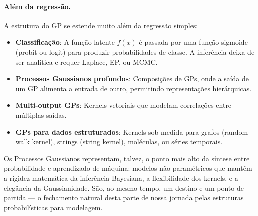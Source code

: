 \documentclass{tufte-handout}
\begin{document}
\paragraph{Além da regressão.}

A estrutura do GP se estende muito além da regressão simples:
\begin{itemize}
    \item \textbf{Classificação}: A função latente $f(x)$ é passada por uma função sigmoide (probit ou logit) para produzir probabilidades de classe. A inferência deixa de ser analítica e requer Laplace, EP, ou MCMC.
    \item \textbf{Processos Gaussianos profundos}: Composições de GPs, onde a saída de um GP alimenta a entrada de outro, permitindo representações hierárquicas.
    \item \textbf{Multi-output GPs}: Kernels vetoriais que modelam correlações entre múltiplas saídas.
    \item \textbf{GPs para dados estruturados}: Kernels sob medida para grafos (random walk kernel), strings (string kernel), moléculas, ou séries temporais.
\end{itemize}

Os Processos Gaussianos representam, talvez, o ponto mais alto da síntese entre probabilidade e aprendizado de máquina: modelos não-paramétricos que mantêm a rigidez matemática da inferência Bayesiana, a flexibilidade dos kernels, e a elegância da Gaussianidade. São, ao mesmo tempo, um destino e um ponto de partida --- o fechamento natural desta parte de nossa jornada pelas estruturas probabilísticas para modelagem.

\begin{marginfigure}
    \caption{Função seno (wp-primary), dados observados (wp-accent), e possível amostra de GP ajustado (wp-muted tracejado).}
\end{marginfigure}
\end{document}
